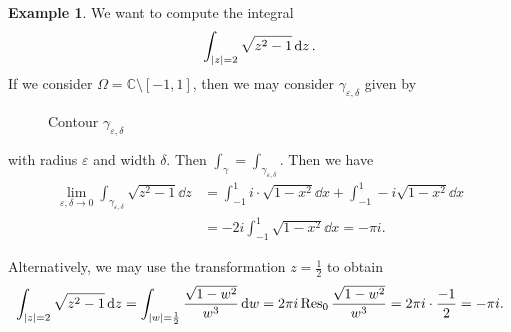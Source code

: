 \documentclass[leqno, openany]{memoir}
\theoremstyle{definition}
\newtheorem{exm}[thm]{Example}
\theoremstyle{remark}
\theoremstyle{plain}
\theoremstyle{definition}
\theoremstyle{remark}
\newcommand{\C}{\mathbb{C}}
\newcommand{\ep}{\varepsilon}
\begin{document}
\begin{exm}
    We want to compute the integral
    \[ \int_{\abs{z} = 2} \sqrt{z^2-1} \dd{z}. \]
    If we consider $\Omega = \C \setminus [-1,1]$, then we may consider $\gamma_{\ep, \delta}$ given by
    \begin{figure}[H]
    \begin{center}
    \end{center}
    \caption{Contour $\gamma_{\ep, \delta}$}%
    \label{fig:}
    \end{figure}
    with radius $\ep$ and width $\delta$. Then $\int_{\gamma} = \int_{\gamma_{\ep, \delta}}$. Then we have
    \begin{align*} 
        \lim_{\ep, \delta \to 0} \int_{\gamma_{\ep, \delta}} \sqrt{z^2-1} \dd{z} &= \int_{-1}^1 i \cdot \sqrt{1-x^2} \dd{x}+ \int_{-1}^1 -i \sqrt{1-x^2} \dd{x} \\
                                                                                 &= -2i \int_{-1}^1 \sqrt{1-x^2} \dd{x} = -\pi i.
    \end{align*}

    Alternatively, we may use the transformation $z = \frac{1}{2}$ to obtain
    \[ \int_{\abs{z} = 2} \sqrt{z^2-1} \dd{z} = \int_{\abs{w} = \frac{1}{2}} \frac{\sqrt{1-w^2}}{w^3} \dd{w} = 2 \pi i \Res_0 \frac{\sqrt{1-w^2}}{w^3} = 2 \pi i \cdot \frac{-1}{2} = - \pi i. \]
\end{exm}
\end{document}
